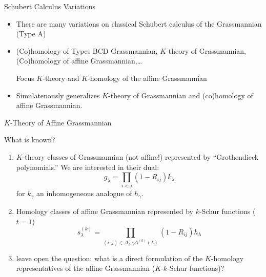 \documentclass{beamer}
\begin{document}
\begin{frame}{Schubert Calculus Variations}
  \begin{itemize}
  \item There are many variations on classical Schubert calculus of the
  Grassmannian (Type A)\pause
  \item (Co)homology of Types BCD Grassmannian, \(K\)-theory of
    Grassmannian, (Co)homology of affine Grassmannian,\ldots \pause
  \begin{block}{Focus}
    \(K\)-theory and \(K\)-homology of the affine Grassmannian \pause
  \end{block}
  \item Simulatenously generalizes \(K\)-theory of Grassmannian and
    (co)homology of affine Grassmannian.
  \end{itemize}
\end{frame}
\begin{frame}{\(K\)-Theory of Affine Grassmannian}
  \begin{block}{What is known?}
  \pause
    \begin{enumerate}
    \item \(K\)-theory classes of Grassmannian (not affine!)
      represented by
      ``Grothendieck 
      polynomials.'' We are interested in their dual: \[
        g_\lambda = \prod_{i < j} (1-R_{ij}) k_\lambda
      \]
      for \(k_\gamma\) an inhomogeneous analogue of \(h_\gamma\).\pause
    \item Homology classes of affine Grassmannian represented by
      \(k\)-Schur functions (\(t=1\)) \[
        s_\lambda^{(k)} = \prod_{(i,j) \in \Delta^+_\ell \setminus
          \Delta^{(k)}(\lambda)} (1-R_{ij}) h_\lambda
        \] \pause
    \vspace{-0.2in}
    \item \cite{lss} leave open the question: what is a direct formulation of the \(K\)-homology representatives of the affine Grassmannian (\(K\)-\(k\)-Schur functions)?
    \end{enumerate}
  \end{block}
\end{frame}
\end{document}

